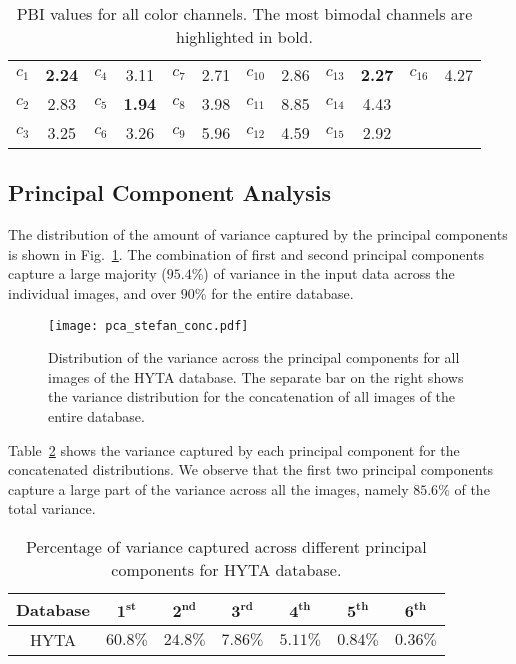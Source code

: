\begin{table}[H]
\normalsize
\centering
\setlength{\tabcolsep}{3pt} %
\begin{tabular}{c|c||c|c||c|c||c|c||c|c||c|c}
  \hline
  $c_{1}$ & \textbf{2.24} & $c_{4}$ & 3.11 & $c_{7}$ & 2.71 & $c_{10}$ & 2.86 & $c_{13}$ & \textbf{2.27} & $c_{16}$ & 4.27\\
  $c_{2}$ & 2.83 & $c_{5}$ & \textbf{1.94} & $c_{8}$ & 3.98 & $c_{11}$ & 8.85 & $c_{14}$ & 4.43 & $ $ & $ $\\
  $c_{3}$ & 3.25 & $c_{6}$ & 3.26 & $c_{9}$ & 5.96 & $c_{12}$ & 4.59 & $c_{15}$ & 2.92 & $ $ & $ $\\
  \hline
\end{tabular}
\caption[PBI values for all color channels.]{PBI values for all color channels. The most bimodal channels are highlighted in bold.}
\label{PBI16}
\end{table}


\subsection{Principal Component Analysis}
The distribution of the amount of variance captured by the principal components is shown in Fig.~\ref{fig:pca16_stefan}. The combination of first and second principal components capture a large majority ($95.4$\%) of variance in the input data across the individual images, and over $90$\% for the entire database.

\begin{figure}[htbp]
\centering
\texttt{[image: pca\_stefan\_conc.pdf]}
\caption[Distribution of the variance across the principal components for all images of the HYTA database.]{Distribution of the variance across the principal components for all images of the HYTA database. The separate bar on the right shows the variance distribution for the concatenation of all images of the entire database.
\label{fig:pca16_stefan}}
\end{figure}

Table~\ref{table:PCA-table} shows the variance captured by each principal component for the concatenated distributions. We observe that the first two principal components capture a large part of the variance across all the images, namely $85.6\%$ of the total variance. 

\begin{table}[htb]
\normalsize
\centering
\setlength{\tabcolsep}{3pt} 
\begin{tabular}{c||c|c|c|c|c|c}
  \hline
  \textbf{Database} & $\mathbf{1^{st}}$ & $\mathbf{2^{nd}}$ & $\mathbf{3^{rd}}$ & $\mathbf{4^{th}}$ & $\mathbf{5^{th}}$ & $\mathbf{6^{th}}$ \\
  \hline
  HYTA & $60.8\%$ & $24.8\%$ & $7.86\%$ & $5.11\%$ & $0.84\%$ & $0.36\%$ \\
  \hline
\end{tabular}
\caption{Percentage of variance captured across different principal components for HYTA database.}
\label{table:PCA-table}
\end{table}


